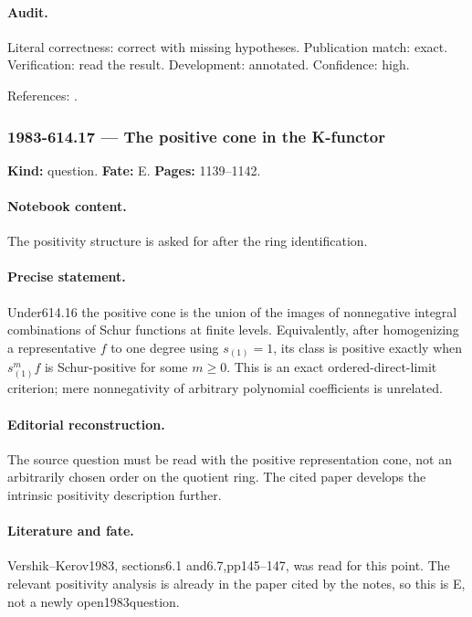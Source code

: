 \paragraph{Audit.} Literal correctness: correct with missing hypotheses. Publication match: exact. Verification: read the result. Development: annotated. Confidence: high.

\noindent References: \citep{vershikkerov1983kfunctor}.\par

\subsubsection{1983-614.17 --- The positive cone in the K-functor}

\label{item:1983-614.17}

\noindent\textbf{Kind:} question. \textbf{Fate:} E. \textbf{Pages:} 1139--1142.\par

\paragraph{Notebook content.} The positivity structure is asked for after the ring identification.

\paragraph{Precise statement.} Under614.16 the positive cone is the union of the images of nonnegative integral combinations of Schur functions at finite levels. Equivalently, after homogenizing a representative $f$ to one degree using $s_{(1)}=1$, its class is positive exactly when $s_{(1)}^mf$ is Schur-positive for some $m\ge0$. This is an exact ordered-direct-limit criterion; mere nonnegativity of arbitrary polynomial coefficients is unrelated.

\paragraph{Editorial reconstruction.} The source question must be read with the positive representation cone, not an arbitrarily chosen order on the quotient ring. The cited paper develops the intrinsic positivity description further.

\paragraph{Literature and fate.} Vershik--Kerov1983, sections6.1 and6.7,pp145--147, was read for this point. The relevant positivity analysis is already in the paper cited by the notes, so this is E, not a newly open1983question.

